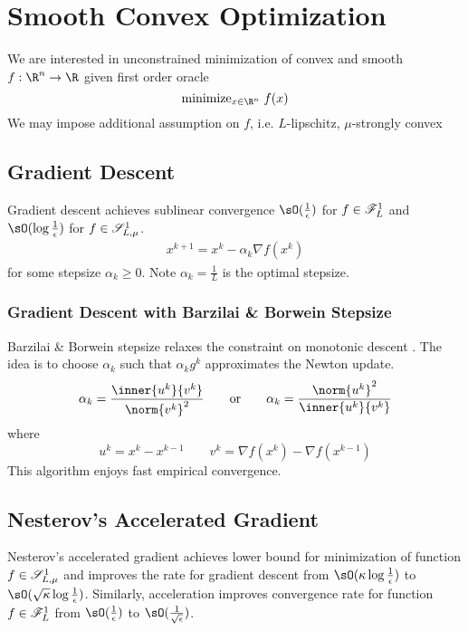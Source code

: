 \documentclass[../summary.tex]{subfiles}
\begin{document}
\section{Smooth Convex Optimization}

We are interested in unconstrained minimization of convex and smooth $f:\R^n \to \R$ given first order oracle
\[
    \text{minimize}_{x\in\R^n}\; f(x)
\]
We may impose additional assumption on $f$, i.e. $L$-lipschitz, $\mu$-strongly convex

\subsection{Gradient Descent}

Gradient descent achieves sublinear convergence $\sO(\frac{1}{\epsilon})$ for $f\in \mathscr{F}_{L}^1$ and $\sO(\log \frac{1}{\epsilon})$ for $f\in\mathscr{S}_{L,\mu}^1$. 
\begin{align*}
    x^{k+1} = x^k - \alpha_k \nabla f(x^k)
\end{align*}
for some stepsize $\alpha_k \geq 0$. Note $\alpha_k = \frac{1}{L}$ is the optimal stepsize.  

\subsubsection{Gradient Descent with Barzilai \& Borwein Stepsize}

Barzilai \& Borwein stepsize relaxes the constraint on monotonic descent \cite{barzilaiTwoPointStepSize1988}. The idea is to choose $\alpha_k$ such that $\alpha_k g^k$ approximates the Newton update.
\begin{align*}
    \alpha_k = \frac{\inner{u^k}{v^k}}{\norm{v^k}^2}
    \quad\quad\text{or}\quad\quad
    \alpha_k = \frac{\norm{u^k}^2}{\inner{u^k}{v^k}}
\end{align*}
where 
\[
    u^k = x^k - x^{k-1}
    \quad\quad
    v^k = \nabla f(x^k) - \nabla f(x^{k-1})
\]
This algorithm enjoys fast empirical convergence.

\subsection{Nesterov's Accelerated Gradient}

Nesterov's accelerated gradient achieves lower bound for minimization of function $f\in \mathscr{S}_{L,\mu}^1$ and improves the rate for gradient descent from $\sO(\kappa\log \frac{1}{\epsilon})$ to $\sO(\sqrt{\kappa}\log \frac{1}{\epsilon})$. Similarly, acceleration improves convergence rate for function $ f\in\mathscr{F}_{L}^1$ from $\sO(\frac{1}{\epsilon})$ to $\sO(\frac{1}{\sqrt{\epsilon}})$.
\end{document}
